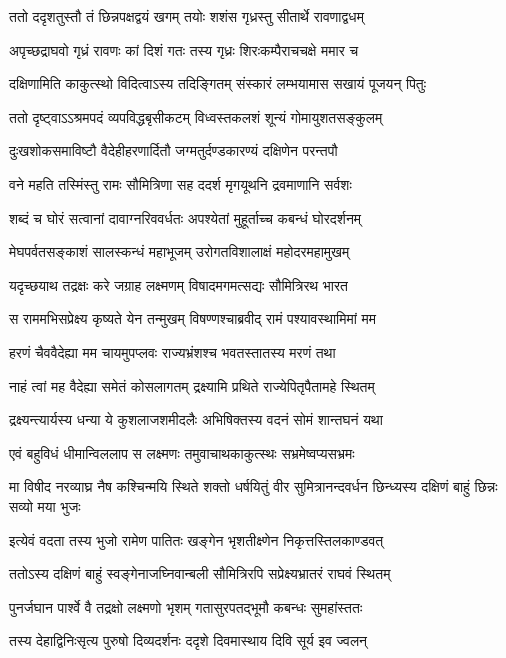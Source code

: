 \twolineshloka
{ततो ददृशतुस्तौ तं छिन्नपक्षद्वयं खगम्}
{तयोः शशंस गृध्रस्तु सीतार्थे रावणाद्वधम्}


\twolineshloka
{अपृच्छद्राघवो गृध्रं रावणः कां दिशं गतः}
{तस्य गृध्रः शिरःकम्पैराचचक्षे ममार च}


\twolineshloka
{दक्षिणामिति काकुत्स्थो विदित्वाऽस्य तदिङ्गितम्}
{संस्कारं लम्भयामास सखायं पूजयन् पितुः}


\twolineshloka
{ततो दृष्ट्वाऽऽश्रमपदं व्यपविद्धबृसीकटम्}
{विध्वस्तकलशं शून्यं गोमायुशतसङ्कुलम्}


\twolineshloka
{दुःखशोकसमाविष्टौ वैदेहीहरणार्दितौ}
{जग्मतुर्दण्डकारण्यं दक्षिणेन परन्तपौ}


\twolineshloka
{वने महति तस्मिंस्तु रामः सौमित्रिणा सह}
{ददर्श मृगयूथनि द्रवमाणानि सर्वशः}


\twolineshloka
{शब्दं च घोरं सत्वानां दावाग्नरिववर्धतः}
{अपश्येतां मुहूर्ताच्च कबन्धं घोरदर्शनम्}


\twolineshloka
{मेघपर्वतसङ्काशं सालस्कन्धं महाभूजम्}
{उरोगतविशालाक्षं महोदरमहामुखम्}


\twolineshloka
{यदृच्छयाथ तद्रक्षः करे जग्राह लक्ष्मणम्}
{विषादमगमत्सद्यः सौमित्रिरथ भारत}


\twolineshloka
{स राममभिसप्रेक्ष्य कृष्यते येन तन्मुखम्}
{विषण्णश्चाब्रवीद् रामं पश्यावस्थामिमां मम}


\twolineshloka
{हरणं चैववैदेह्या मम चायमुपप्लवः}
{राज्यभ्रंशश्च भवतस्तातस्य मरणं तथा}


\twolineshloka
{नाहं त्वां मह वैदेह्या समेतं कोसलागतम्}
{द्रक्ष्यामि प्रथिते राज्येपितृपैतामहे स्थितम्}


\twolineshloka
{द्रक्ष्यन्त्यार्यस्य धन्या ये कुशलाजशमीदलैः}
{अभिषिक्तस्य वदनं सोमं शान्तघनं यथा}


\twolineshloka
{एवं बहुविधं धीमान्विललाप स लक्ष्मणः}
{तमुवाचाथकाकुत्स्थः सभ्रमेष्वप्यसभ्रमः}


\threelineshloka
{मा विषीद नरव्याघ्र नैष कश्चिन्मयि स्थिते}
{शक्तो धर्षयितुं वीर सुमित्रानन्दवर्धन}
{छिन्ध्यस्य दक्षिणं बाहुं छिन्नः सव्यो मया भुजः}


\twolineshloka
{इत्येवं वदता तस्य भुजो रामेण पातितः}
{खङ्गेन भृशतीक्ष्णेन निकृत्तस्तिलकाण्डवत्}


\twolineshloka
{ततोऽस्य दक्षिणं बाहुं स्वङ्गेनाजघ्निवान्बली}
{सौमित्रिरपि सप्रेक्ष्यभ्रातरं राघवं स्थितम्}


\twolineshloka
{पुनर्जघान पार्श्वे वै तद्रक्षो लक्ष्मणो भृशम्}
{गतासुरपतद्भूमौ कबन्धः सुमहांस्ततः}


\twolineshloka
{तस्य देहाद्विनिःसृत्य पुरुषो दिव्यदर्शनः}
{ददृशे दिवमास्थाय दिवि सूर्य इव ज्वलन्}


